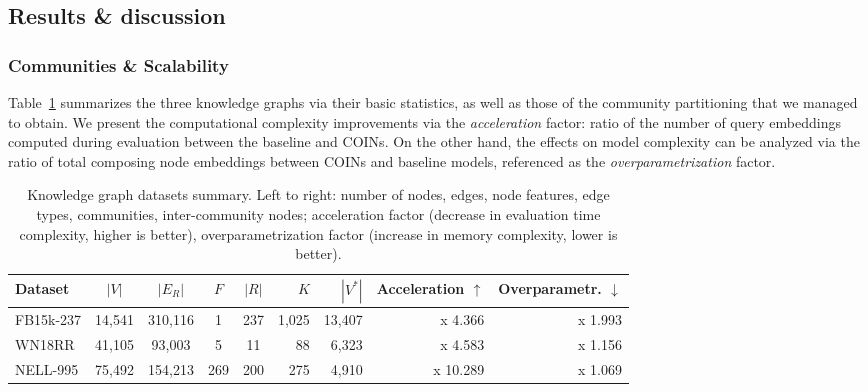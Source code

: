 %

\subsection{Results \& discussion}
\label{sec:results}

\subsubsection{Communities \& Scalability}

Table~\ref{tab:datasets} summarizes the three knowledge graphs via their basic statistics, as well as those of the community partitioning that we managed to obtain. We present the computational complexity improvements via the \emph{acceleration} factor: ratio of the number of query embeddings computed during evaluation between the baseline and COINs. On the other hand, the effects on model complexity can be analyzed via the ratio of total composing node embeddings between COINs and baseline models, referenced as the \emph{overparametrization} factor. 

\begin{table}[H]
  \caption[Knowledge graph datasets summary.]{Knowledge graph datasets summary. Left to right: number of nodes, edges, node features, edge types, communities, inter-community nodes; acceleration factor (decrease in evaluation time complexity, higher is better), overparametrization factor (increase in memory complexity, lower is better).}
  \label{tab:datasets}
  \centering
  \begin{adjustbox}{width=\textwidth}
  \begin{tabular}{lccccrrrr}
    \toprule
    Dataset & $|V|$ & $|E_R|$ & $F$ & $|R|$ & $K$ & $|V^*|$ & Acceleration $\uparrow$ & Overparametr. $\downarrow$ \\ %
    \midrule
    FB15k-237 & 14,541 & 310,116 & 1 & 237 & 1,025 & 13,407 & x 4.366 & x 1.993 \\
    WN18RR & 41,105 & 93,003 & 5 & 11 & 88 & 6,323 & x 4.583 & x 1.156 \\
    NELL-995 & 75,492 & 154,213 & 269 & 200 & 275 & 4,910 & x 10.289 & x 1.069 \\
    \bottomrule
  \end{tabular}
  \end{adjustbox}
\end{table}

